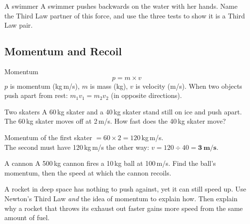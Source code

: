 \begin{wedo}{A swimmer}
A swimmer pushes backwards on the water with her hands. Name the Third Law partner of this force, and use the three tests to show it is a Third Law pair.
\end{wedo}

\subsection{Momentum and Recoil}\label{sub:a3.2}

\begin{skillbox}{Momentum}
\[ p = m \times v \]
$p$ is momentum (kg\,m/s), $m$ is mass (kg), $v$ is velocity (m/s). When two objects push apart from rest: \quad $m_1 v_1 = m_2 v_2$ (in opposite directions).
\end{skillbox}

\begin{workedex}{Two skaters}
A 60\,kg skater and a 40\,kg skater stand still on ice and push apart. The 60\,kg skater moves off at 2\,m/s. How fast does the 40\,kg skater move?

\smallskip
Momentum of the first skater $= 60 \times 2 = 120$\,kg\,m/s.\\
The second must have 120\,kg\,m/s the other way: $v = 120 \div 40 = \mathbf{3\ \text{m/s}}$.
\end{workedex}

\begin{wedo}{A cannon}
A 500\,kg cannon fires a 10\,kg ball at 100\,m/s. Find the ball's momentum, then the speed at which the cannon recoils.
\end{wedo}

\label{prac:3}


\label{ext:3}

\task A rocket in deep space has nothing to push against, yet it can still speed up. Use Newton's Third Law \emph{and} the idea of momentum to explain how. Then explain why a rocket that throws its exhaust out faster gains more speed from the same amount of fuel.

\clearpage
\setcounter{section}{3}\renewcommand{\lessonart}{5}
\label{sec:4}

